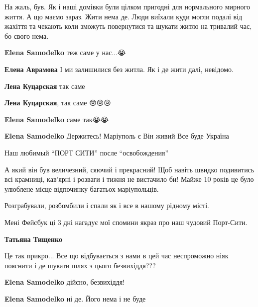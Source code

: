  
 
 
 
 

\qqSecCmt


На жаль, був. Як і наші домівки були цілком пригодні для нормального мирного
життя. А що маємо зараз. Жити нема де. Люди виїхали куди могли подалі від
жахіття та чекають коли зможуть повернутися та шукати житло на тривалий час, бо
свого нема.

\begin{itemize} %
\textbf{Elena Samodelko} теж саме у нас...😭

\textbf{Елена Аврамова} І ми залишилися без житла. Як і де жити далі, невідомо.

\textbf{Лена Куцарская} так саме

\textbf{Лена Куцарская}, так саме 😢😢😢

\textbf{Elena Samodelko} саме так😭😭

\textbf{Elena Samodelko} Держитесь! Маріуполь є Він живий Все буде Україна
\end{itemize} %


Наш любимый \enquote{ПОРТ СИТИ} после \enquote{освобождения}


А який він був величезний, сяючий і прекрасний! Щоб навіть швидко подивитись
всі крамниці, кав'ярні і розваги і тижня не вистачило би! Майже 10 років це
було улюблене місце відпочинку багатьох маріупольців.

Розграбували, розбомбили і спали як і все в нашому рідному місті.

Мені Фейсбук ці 3 дні нагадує мої спомини якраз про наш чудовий Порт-Сити.

\begin{itemize} %
\textbf{Татьяна Тищенко} 

Це так прикро... Все що відбувається з нами в цей час неспроможно ніяк пояснити
і де шукати шлях з цього безвихіддя???

\textbf{Elena Samodelko} дійсно, безвихіддя!

\textbf{Elena Samodelko} ні де. Його нема і не буде

\end{itemize} %

